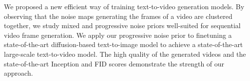 \documentclass[10pt,twocolumn,letterpaper]{article}
\begin{document}
We proposed a new efficient way of training text-to-video generation models.
By observing that the noise maps generating the frames of a video are clustered together, we study mixed and progressive noise priors well-suited for sequential video frame generation. 
We apply our progressive noise prior to finetuning a state-of-the-art diffusion-based text-to-image model to achieve a state-of-the-art large-scale text-to-video model. The high quality of the generated videos and the state-of-the-art Inception and FID scores demonstrate the strength of our approach.







\newcommand{\ModelEffMixedKaalFVD}{
(68, 337.4)
(112, 322.57)
(253, 310.13)
}

\newcommand{\ModelEffProgKaalFVD}{
(68, 339.67)
(112, 322.59)
(253, 298.88)
}

\newcommand{\ModelEffKaalFVD}{
(68, 903.37)
(112, 748.67)
(253, 642.75)
}
 \newcommand{\ModelEffMixedKaalIS}{
(68, 53.52)
(112, 57.93)
(253, 60.01)
}

\newcommand{\ModelEffProgKaalIS}{
(68, 53.52)
(112, 57.31)
(253, 59.82)
}
\end{document}
